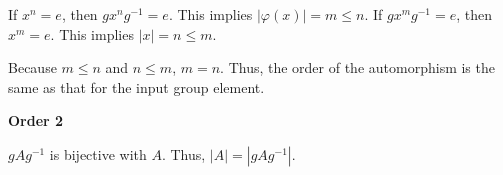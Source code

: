 \documentclass[12pt,letterpaper]{article}
\begin{document}
If $x^n = e$, then $gx^ng^{-1} = e$.  This implies $|\varphi(x)| = m \le n$.
If $gx^mg^{-1} = e$, then $x^m = e$.  This implies $|x| = n \le m$.

Because $m \le n$ and $n \le m$, $m=n$.
Thus, the order of the automorphism is the same as that for the input group element.

\textbf{Order 2}

$gAg^{-1}$ is bijective with $A$.  Thus, $|A| = |gAg^{-1}|$.
\end{document}
